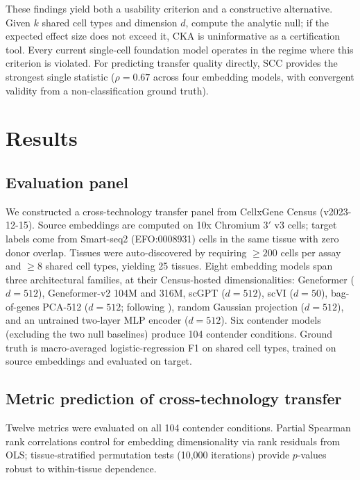 \documentclass[11pt]{article}
\begin{document}
These findings yield both a usability criterion and a constructive
alternative. Given $k$ shared cell types and dimension $d$, compute the
analytic null; if the expected effect size does not exceed it, CKA is
uninformative as a certification tool. Every current single-cell
foundation model operates in the regime where this criterion is
violated. For predicting transfer quality directly, SCC provides the
strongest single statistic ($\rho = 0.67$ across four embedding
models, with convergent validity from a non-classification ground
truth).


\section{Results}

\subsection{Evaluation panel}
\label{sec:panel}

We constructed a cross-technology transfer panel from CellxGene Census
(v2023-12-15). Source embeddings are computed on 10x Chromium 3$'$ v3
cells; target labels come from Smart-seq2 (EFO:0008931) cells in the
same tissue with zero donor overlap. Tissues were auto-discovered by
requiring $\geq 200$ cells per assay and $\geq 8$ shared cell types,
yielding 25 tissues. Eight embedding models
span three architectural families, at their Census-hosted dimensionalities:
Geneformer \citep{theodoris2023geneformer} ($d = 512$), Geneformer-v2 104M and 316M, scGPT \citep{cui2024scgpt}
($d = 512$), scVI \citep{lopez2018scvi} ($d = 50$), bag-of-genes
PCA-512 ($d = 512$; following \citealp{cole2026morpheus}), random
Gaussian projection ($d = 512$), and an untrained two-layer MLP encoder
($d = 512$). Six contender models (excluding the two null baselines)
produce 104 contender conditions. Ground truth is macro-averaged
logistic-regression F1 on shared cell types, trained on source
embeddings and evaluated on target.


\subsection{Metric prediction of cross-technology transfer}
\label{sec:prediction}

Twelve metrics were evaluated on all 104 contender conditions. Partial
Spearman rank correlations control for embedding dimensionality via rank
residuals from OLS; tissue-stratified permutation tests (10,000
iterations) provide $p$-values robust to within-tissue dependence.
\end{document}
